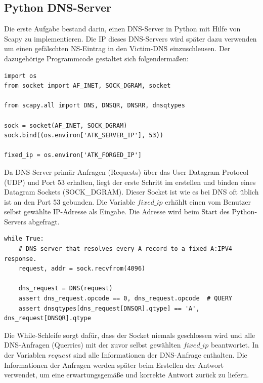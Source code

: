 \documentclass[10pt,a4paper]{article}
\begin{document}
\subsection{Python DNS-Server}
Die erste Aufgabe bestand darin, einen DNS-Server in Python mit Hilfe von Scapy zu implementieren. Die IP dieses DNS-Servers wird später dazu verwenden um einen gefälschten NS-Eintrag in den Victim-DNS einzuschleusen. Der dazugehörige Programmcode gestaltet sich folgendermaßen:
\begin{center}
\begin{lstlisting}
import os
from socket import AF_INET, SOCK_DGRAM, socket

from scapy.all import DNS, DNSQR, DNSRR, dnsqtypes

sock = socket(AF_INET, SOCK_DGRAM)
sock.bind((os.environ['ATK_SERVER_IP'], 53))

fixed_ip = os.environ['ATK_FORGED_IP']
\end{lstlisting}
\end{center}
Da DNS-Server primär Anfragen (Requests) über das User Datagram Protocol (UDP) und Port 53 erhalten, liegt der erste Schritt im erstellen und binden eines Datagram Sockets (SOCK\_DGRAM). Dieser Socket ist wie es bei DNS oft üblich ist an den Port 53 gebunden. Die Variable $fixed\_ip$ erhählt einen vom Benutzer selbst gewählte IP-Adresse als Eingabe. Die Adresse wird beim Start des Python-Servers abgefragt.
\begin{center}
\begin{lstlisting}
while True:
    # DNS server that resolves every A record to a fixed A:IPV4 response.
    request, addr = sock.recvfrom(4096)

    dns_request = DNS(request)
    assert dns_request.opcode == 0, dns_request.opcode  # QUERY
    assert dnsqtypes[dns_request[DNSQR].qtype] == 'A', dns_request[DNSQR].qtype
\end{lstlisting}
\end{center}
Die While-Schleife sorgt dafür, dass der Socket niemals geschlossen wird und alle DNS-Anfragen (Querries) mit der zuvor selbst gewählten $\mathit{fixed\_ip}$ beantwortet. In der Variablen $\mathit{request}$ sind alle Informationen der DNS-Anfrage enthalten. Die Informationen der Anfragen werden später beim Erstellen der Antwort verwendet, um eine erwartungsgemäße und korrekte Antwort zurück zu liefern. 
\end{document}
